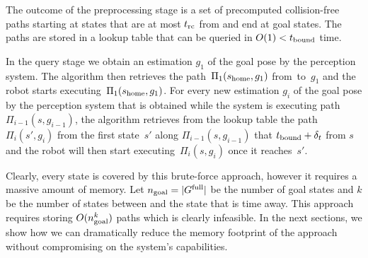 \documentclass[conference]{IEEEtran}
\begin{document}
The outcome of the preprocessing stage is a set of precomputed collision-free paths starting at states that are at most $t_{\textrm{rc}}$ from \Shome and end at goal states.
The paths are stored in a lookup table that can be queried in $O(1) < t_{\textrm{bound}}$ time.

In the query stage we obtain an estimation $g_1$ of the goal pose by the perception system. 
The algorithm then retrieves the path~$\Pi_1(s_{\textrm{home}},g_1)$ from~\Shome to~$g_1$ and the robot starts executing~$\Pi_1(s_{\textrm{home}},g_1)$.
%
For every new estimation $g_i$ of the goal pose by the perception system that is obtained while the system is executing path $\Pi_{i-1}(s,g_{i-1})$, the algorithm retrieves from the lookup table the path $\Pi_i(s',g_i)$ from the first state~$s'$ along $\Pi_{i-1}(s,g_{i-1})$ that $t_{\textrm{bound}} + \delta_t$ from $s$ and the robot will then start executing~$\Pi_i(s,g_i)$ once it reaches~$s'$.

Clearly, every state is covered by this brute-force approach, however it requires a massive amount of memory.
Let $n_{\rm goal} = \vert G^{\textrm{full}} \vert$ be the number of goal states and
$k$ be the number of states between \Shome and the state that is \Trc time away.
This approach requires storing $O(n_{\rm goal}^k)$ paths which is clearly infeasible.
In the next sections, we show how we can dramatically reduce the memory footprint of the approach without compromising on the system's capabilities.
\end{document}
